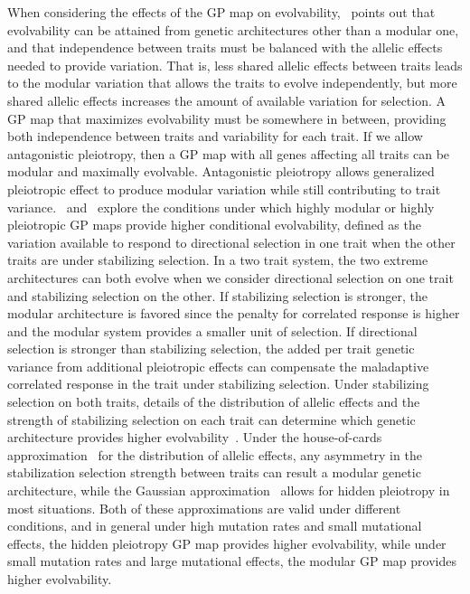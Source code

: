 \begin{refsection}
When considering the effects of the GP map on
evolvability,~\textcite{Hansen2003-fh} points out that evolvability can be
attained from genetic architectures other than a modular one, and that
independence between traits must be balanced with the allelic effects needed
to provide variation. That is, less shared allelic effects between traits
leads to the modular variation that allows the traits to evolve independently,
but more shared allelic effects increases the amount of available variation
for selection. A GP map that maximizes evolvability must be somewhere in
between, providing both independence between traits and variability for each
trait. If we allow antagonistic pleiotropy, then a GP map with all genes
affecting all traits can be modular and maximally evolvable. Antagonistic
pleiotropy allows generalized pleiotropic effect to produce modular variation
while still contributing to trait variance.~\textcite{Hansen2003-fh}
and~\textcite{Pavlicev2011-xm} explore the conditions under which highly
modular or highly pleiotropic GP maps provide higher conditional evolvability,
defined as the variation available to respond to directional selection in one
trait when the other traits are under stabilizing selection. In a two trait
system, the two extreme architectures can both evolve when we consider
directional selection on one trait and stabilizing selection on the other. If
stabilizing selection is stronger, the modular architecture is favored since
the penalty for correlated response is higher and the modular system provides
a smaller unit of selection. If directional selection is stronger than
stabilizing selection, the added per trait genetic variance from additional
pleiotropic effects can compensate the maladaptive correlated response in the
trait under stabilizing selection. Under stabilizing selection on both traits,
details of the distribution of allelic effects and the strength of stabilizing
selection on each trait can determine which genetic architecture provides
higher evolvability~\parencite{Pavlicev2011-xm}. Under the house-of-cards
approximation~\parencite{Turelli1984-cp} for the distribution of allelic
effects, any asymmetry in the stabilization selection strength between traits
can result a modular genetic architecture, while the Gaussian
approximation~\parencite{Lande1980-kn} allows for hidden pleiotropy in most
situations. Both of these approximations are valid under different conditions,
and in general under high mutation rates and small mutational effects, the
hidden pleiotropy GP map provides higher evolvability, while under small
mutation rates and large mutational effects, the modular GP map provides
higher evolvability.


\end{refsection}
